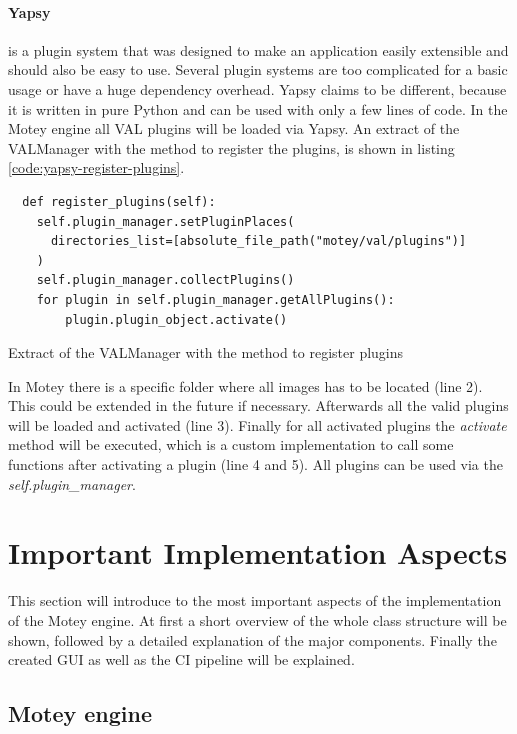 \paragraph{Yapsy} is a plugin system that was designed to make an application easily extensible and should also be easy to use.
Several plugin systems are too complicated for a basic usage or have a huge dependency overhead.
Yapsy claims to be different, because it is written in pure Python and can be used with only a few lines of code.
In the Motey engine all \ac{VAL} plugins will be loaded via Yapsy.
An extract of the VALManager with the method to register the plugins, is shown in listing \ref{code:yapsy-register-plugins}.
\begin{listing}[H]
  \begin{verbatim}
  def register_plugins(self):
    self.plugin_manager.setPluginPlaces(
      directories_list=[absolute_file_path("motey/val/plugins")]
    )
    self.plugin_manager.collectPlugins()
    for plugin in self.plugin_manager.getAllPlugins():
        plugin.plugin_object.activate()
  \end{verbatim}
  \caption{Extract of the VALManager with the method to register plugins}
  \label{code:yapsy-register-plugins}
\end{listing}
In Motey there is a specific folder where all images has to be located (line 2).
This could be extended in the future if necessary.
Afterwards all the valid plugins will be loaded and activated (line 3).
Finally for all activated plugins the \textit{activate} method will be executed, which is a custom implementation to call some functions after activating a plugin (line 4 and 5).
All plugins can be used via the \textit{self.plugin\_manager}.

\section{Important Implementation Aspects}
This section will introduce to the most important aspects of the implementation of the Motey engine.
At first a short overview of the whole class structure will be shown, followed by a detailed explanation of the major components.
Finally the created \ac{GUI} as well as the \ac{CI} pipeline will be explained.


\subsection{Motey engine}

